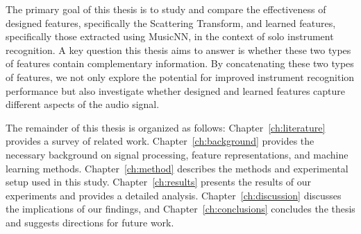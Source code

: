 The primary goal of this thesis is to study and compare the effectiveness of designed features, specifically the Scattering Transform, and learned features, specifically those extracted using MusicNN, in the context of solo instrument recognition. A key question this thesis aims to answer is whether these two types of features contain complementary information. By concatenating these two types of features, we not only explore the potential for improved instrument recognition performance but also investigate whether designed and learned features capture different aspects of the audio signal.

The remainder of this thesis is organized as follows: Chapter~\ref{ch:literature} provides a survey of related work. Chapter~\ref{ch:background} provides the necessary background on signal processing, feature representations, and machine learning methods. Chapter~\ref{ch:method} describes the methods and experimental setup used in this study. Chapter~\ref{ch:results} presents the results of our experiments and provides a detailed analysis. Chapter~\ref{ch:discussion} discusses the implications of our findings, and Chapter~\ref{ch:conclusions} concludes the thesis and suggests directions for future work.
